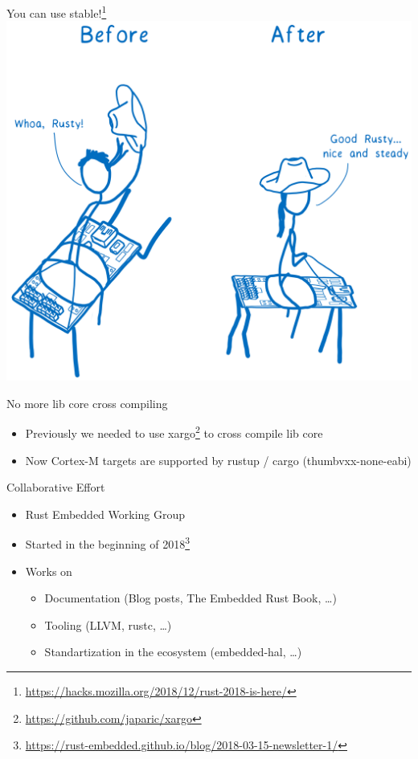 \documentclass[aspectratio=1610,14pt,t]{beamer}
\begin{document}
\begin{frame}[c]{You can use stable!\footnote{\url{https://hacks.mozilla.org/2018/12/rust-2018-is-here/}}}
  \centering
  \includegraphics[width=.6\textwidth]{img/embedded-is-stable.png}
\end{frame}

\begin{frame}[c]{No more lib core cross compiling}
  \begin{itemize}
    \item Previously we needed to use
      xargo\footnote{\url{https://github.com/japaric/xargo}} to cross compile
      lib core
    \item Now Cortex-M targets are supported by rustup / cargo
      (thumbvxx-none-eabi)
  \end{itemize}
\end{frame}

\begin{frame}[c]{Collaborative Effort}
  \begin{itemize}
    \item Rust Embedded Working Group
    \item Started in the beginning of 2018\footnote{\url{https://rust-embedded.github.io/blog/2018-03-15-newsletter-1/}}
    \item Works on
      \begin{itemize}
        \item Documentation (Blog posts, The Embedded Rust Book, \ldots)
        \item Tooling (LLVM, rustc, \ldots)
        \item Standartization in the ecosystem (embedded-hal, \ldots)
      \end{itemize}
  \end{itemize}
\end{frame}
\end{document}
